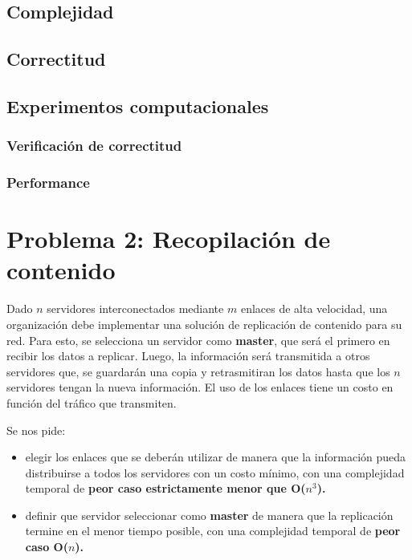 \documentclass[a4paper, 10pt, twoside]{article}
\begin{document}
\subsection{Complejidad}

\subsection{Correctitud}

\subsection{Experimentos computacionales}
\subsubsection{Verificación de correctitud}

\subsubsection{Performance}




\newpage

\section{Problema 2: Recopilación de contenido}

Dado $n$ servidores interconectados mediante $m$ enlaces de alta velocidad, una organización debe implementar una solución de replicación de contenido para su red. Para esto, se selecciona un servidor como \textbf{master}, que será el primero en recibir los datos a replicar. Luego, la información será transmitida a otros servidores que, se guardarán una copia y retrasmitiran los datos hasta que los $n$ servidores tengan la nueva información. El uso de los enlaces tiene un costo en función del tráfico que transmiten.

Se nos pide:
\begin{itemize}
    \item{elegir los enlaces que se deberán utilizar de manera que la información pueda distribuirse a todos los servidores con un costo mínimo, con una complejidad temporal de \textbf{peor caso estrictamente menor que O($n^3$).}}
    \item{definir que servidor seleccionar como \textbf{master} de manera que la replicación termine en el menor tiempo posible, con una complejidad temporal de \textbf{peor caso O($n$).}}
\end{itemize}
\end{document}

